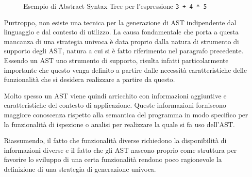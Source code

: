\begin{figure}
\caption{Esempio di Abstract Syntax Tree per l'espressione \texttt{3 + 4 * 5}}
\label{fig:abstract-syntax-tree}
\end{figure}

Purtroppo, non esiste una tecnica per la generazione di AST indipendente dal
linguaggio e dal contesto di utilizzo. La causa fondamentale che porta a questa
mancanza di una strategia univoca è data proprio dalla natura di strumento di
supporto degli AST, natura a cui si è fatto riferimento nel paragrafo
precedente. Essendo un AST uno strumento di supporto, risulta infatti
particolarmente importante che questo venga definito a partire dalle necessità
caratteristiche delle funzionalità che si desidera realizzare a partire da
questo.

Molto spesso un AST viene quindi arricchito con informazioni aggiuntive e
caratteristiche del contesto di applicazione. Queste informazioni forniscono
maggiore conoscenza rispetto alla semantica del programma in modo specifico per
la funzionalità di ispezione o analisi per realizzare la quale si fa uso
dell’AST.

Riassumendo, il fatto che funzionalità diverse richiedono la disponibilità di
informazioni diverse e il fatto che gli AST nascono proprio come struttura per
favorire lo sviluppo di una certa funzionalità rendono poco ragionevole la
definizione di una strategia di generazione univoca.

